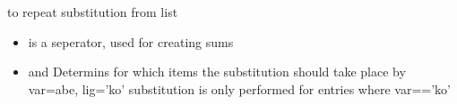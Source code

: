 \documentclass[letterpaper,10pt,english]{sphinxmanual}
\begin{document}
\begin{fulllineitems}
\label{\detokenize{index:modelmanipulation.oldsub_frml}}
\pysigstartsignatures
{}
\pysigstopsignatures
\sphinxAtStartPar
to repeat substitution from list
\begin{itemize}
\item {} 
\sphinxAtStartPar
{} is a seperator, used for creating sums

\item {} 
\sphinxAtStartPar
{} and  Determins for which items the substitution should take place
by var=abe, lig=’ko’ substitution is only performed for entries where var==’ko’

\end{itemize}

\end{fulllineitems}

\end{document}
